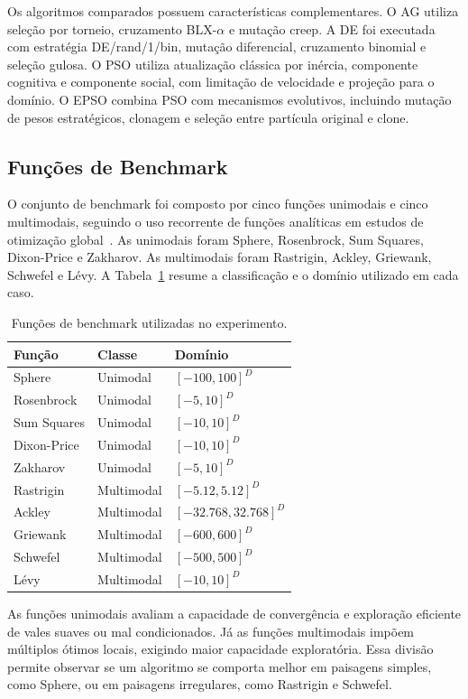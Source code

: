 \documentclass[runningheads]{llncs}
\begin{document}
Os algoritmos comparados possuem características complementares. O AG utiliza seleção por torneio, cruzamento BLX-$\alpha$ e mutação creep. A DE foi executada com estratégia DE/rand/1/bin, mutação diferencial, cruzamento binomial e seleção gulosa. O PSO utiliza atualização clássica por inércia, componente cognitiva e componente social, com limitação de velocidade e projeção para o domínio. O EPSO combina PSO com mecanismos evolutivos, incluindo mutação de pesos estratégicos, clonagem e seleção entre partícula original e clone.

\subsection{Funções de Benchmark}

O conjunto de benchmark foi composto por cinco funções unimodais e cinco multimodais, seguindo o uso recorrente de funções analíticas em estudos de otimização global~\cite{jamil2013literature}. As unimodais foram Sphere, Rosenbrock, Sum Squares, Dixon-Price e Zakharov. As multimodais foram Rastrigin, Ackley, Griewank, Schwefel e Lévy. A Tabela~\ref{tab:benchmarks} resume a classificação e o domínio utilizado em cada caso.

\begin{table}
\centering
\caption{Funções de benchmark utilizadas no experimento.}
\label{tab:benchmarks}
\begin{tabular}{lll}
\toprule
Função & Classe & Domínio \\
\midrule
Sphere & Unimodal & $[-100,100]^D$ \\
Rosenbrock & Unimodal & $[-5,10]^D$ \\
Sum Squares & Unimodal & $[-10,10]^D$ \\
Dixon-Price & Unimodal & $[-10,10]^D$ \\
Zakharov & Unimodal & $[-5,10]^D$ \\
Rastrigin & Multimodal & $[-5.12,5.12]^D$ \\
Ackley & Multimodal & $[-32.768,32.768]^D$ \\
Griewank & Multimodal & $[-600,600]^D$ \\
Schwefel & Multimodal & $[-500,500]^D$ \\
Lévy & Multimodal & $[-10,10]^D$ \\
\bottomrule
\end{tabular}
\end{table}

As funções unimodais avaliam a capacidade de convergência e exploração eficiente de vales suaves ou mal condicionados. Já as funções multimodais impõem múltiplos ótimos locais, exigindo maior capacidade exploratória. Essa divisão permite observar se um algoritmo se comporta melhor em paisagens simples, como Sphere, ou em paisagens irregulares, como Rastrigin e Schwefel.
\end{document}
